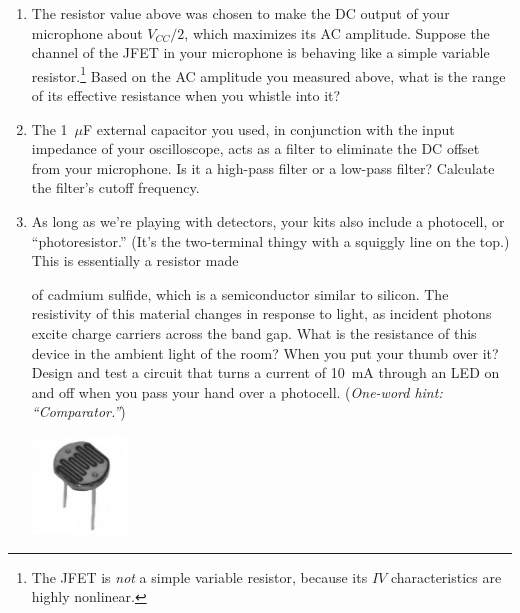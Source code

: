 \begin{enumerate}[wide]
\item The resistor value above was chosen to make the DC output of your microphone about $V_{CC}/2$, which maximizes its AC amplitude.  Suppose the channel of the JFET in your microphone is behaving like a simple variable resistor.\footnote{The JFET is \textit{not} a simple variable resistor, because its $IV$ characteristics are highly nonlinear.}  Based on the AC amplitude you measured above, what is the range of its effective resistance when you whistle into it?


\item The 1~$\mu$F external capacitor you used, in conjunction with the input impedance of your oscilloscope, acts as a filter to eliminate the DC offset from your microphone.  Is it a high-pass filter or a low-pass filter?  Calculate the filter's cutoff frequency.

\item As long as we're playing with detectors, your kits also include a photocell, or ``photoresistor.''  (It's the two-terminal thingy with a squiggly line on 
the top.) This is essentially a resistor made 
\begin{minipage}{0.8\textwidth}
\vspace{.18\baselineskip}
of cadmium sulfide, which is a semiconductor similar to silicon.  The resistivity of this material changes in response to light, 
as incident photons excite charge carriers across the band gap.  What is the resistance of this device in the ambient light of the room?  When you put your thumb over it?  Design and test a circuit that turns a current of 10~mA through an LED on and off  when you pass your hand over a photocell.  (\textit{One-word hint: ``Comparator.''})
\end{minipage}
\begin{minipage}{0.19\textwidth}
\begin{center}
\includegraphics[width=1in]{microphone_photocell/photocell_bw.eps}
\end{center}
\end{minipage}


\end{enumerate}
